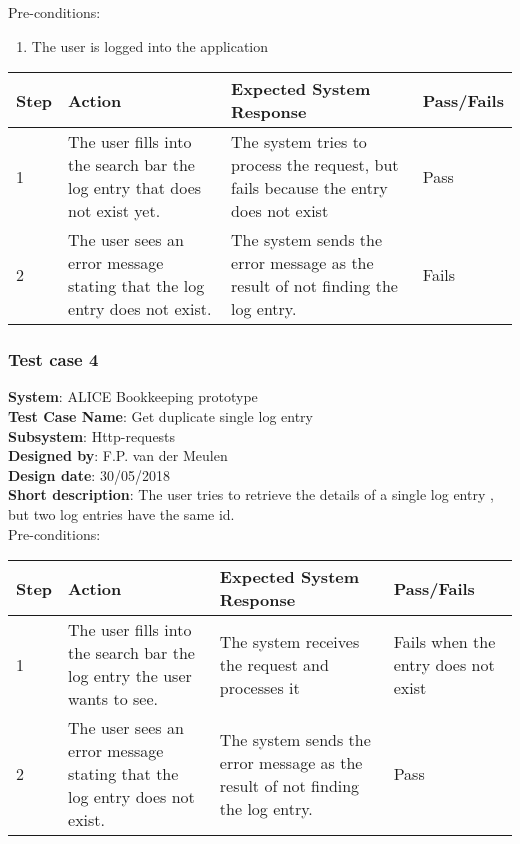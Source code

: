 Pre-conditions: \\
\begin{enumerate}
\item The user is logged into the application
\end{enumerate}

\begin{longtable}{ | p{0.8cm} | p{4.5cm} | p{6cm} | p{1.5cm} |}
\hline
Step & Action & Expected System Response & Pass/Fails  \\ \hline
1 & The user fills into the search bar the log entry that does not exist yet. & The system tries to process the request, but fails because the entry does not exist & Pass  \\ \hline
2 & The user sees an error message stating that the log entry does not exist. & The system sends the error message as the result of not finding the log entry. & Fails \\ \hline

\end{longtable}
\newpage
\subsubsection{Test case 4}
\textbf{System}:  ALICE Bookkeeping prototype \\
\textbf{Test Case Name}:  Get duplicate single log entry \\
\textbf{Subsystem}:  Http-requests \\
\textbf{Designed by}:  F.P. van der Meulen\\
\textbf{Design date}:  30/05/2018\\
\textbf{Short description}: The user tries to retrieve the details of a single log entry , but two log entries have the same id. \\

Pre-conditions: \\

\begin{longtable}{ | p{0.8cm} | p{4.5cm} | p{6cm} | p{1.5cm} |}
\hline
Step & Action & Expected System Response & Pass/Fails  \\ \hline
1 & The user fills into the search bar the log entry the user wants to see. & The system receives the request and processes it & Fails when the entry does not exist  \\ \hline
2 & The user sees an error message stating that the log entry does not exist. & The system sends the error message as the result of not finding the log entry. & Pass \\ \hline

\end{longtable}
